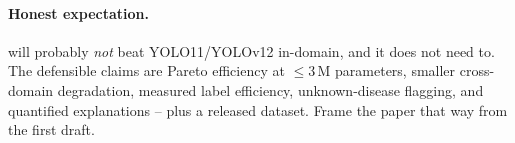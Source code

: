 \paragraph{Honest expectation.} \model{} will probably \emph{not} beat YOLO11/YOLOv12 in-domain, and it does not need to. The defensible claims are Pareto efficiency at $\le$3\,M parameters, smaller cross-domain degradation, measured label efficiency, unknown-disease flagging, and quantified explanations -- plus a released dataset. Frame the paper that way from the first draft.
